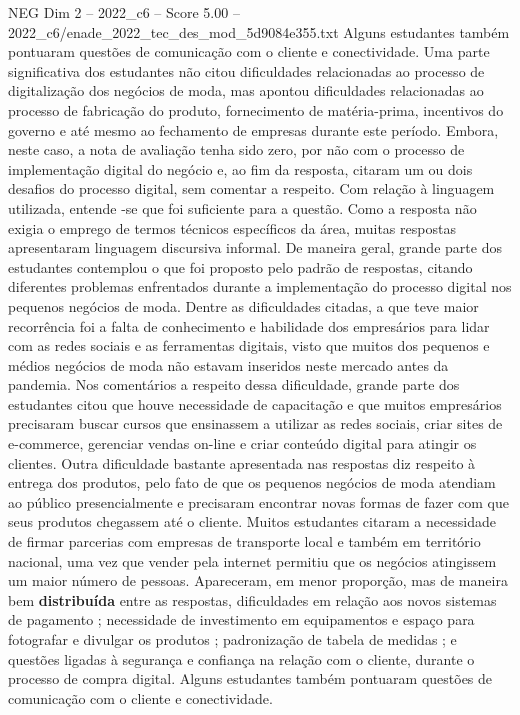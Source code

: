 \begin{textsample}{NEG Dim 2 – 2022\_c6 – Score 5.00 – 2022\_c6/enade\_2022\_tec\_des\_mod\_5d9084e355.txt}
Alguns estudantes também pontuaram questões de comunicação com o cliente e conectividade.
Uma parte significativa dos estudantes não citou dificuldades relacionadas ao processo de digitalização dos negócios de moda, mas apontou dificuldades relacionadas ao processo de fabricação do produto, fornecimento de matéria-prima, incentivos do governo e até mesmo ao fechamento de empresas durante este período.
Embora, neste caso, a nota de avaliação tenha sido zero, por não com o processo de implementação digital do negócio e, ao fim da resposta, citaram um ou dois desafios do processo digital, sem comentar a respeito.
Com relação à linguagem utilizada, entende -se que foi suficiente para a questão.
Como a resposta não exigia o emprego de termos técnicos específicos da área, muitas respostas apresentaram linguagem discursiva informal.
De maneira geral, grande parte dos estudantes contemplou o que foi proposto pelo padrão de respostas, citando diferentes problemas enfrentados durante a implementação do processo digital nos pequenos negócios de moda.
Dentre as dificuldades citadas, a que teve maior recorrência foi a falta de conhecimento e habilidade dos empresários para lidar com as redes sociais e as ferramentas digitais, visto que muitos dos pequenos e médios negócios de moda não estavam inseridos neste mercado antes da pandemia.
Nos comentários a respeito dessa dificuldade, grande parte dos estudantes citou que houve necessidade de capacitação e que muitos empresários precisaram buscar cursos que ensinassem a utilizar as redes sociais, criar sites de e-commerce, gerenciar vendas on-line e criar conteúdo digital para atingir os clientes.
Outra dificuldade bastante apresentada nas respostas diz respeito à entrega dos produtos, pelo fato de que os pequenos negócios de moda atendiam ao público presencialmente e precisaram encontrar novas formas de fazer com que seus produtos chegassem até o cliente.
Muitos estudantes citaram a necessidade de firmar parcerias com empresas de transporte local e também em território nacional, uma vez que vender pela internet permitiu que os negócios atingissem um maior número de pessoas.
Apareceram, em menor proporção, mas de maneira bem \textbf{distribuída} entre as respostas, dificuldades em relação aos novos sistemas de pagamento ; necessidade de investimento em equipamentos e espaço para fotografar e divulgar os produtos ; padronização de tabela de medidas ; e questões ligadas à segurança e confiança na relação com o cliente, durante o processo de compra digital.
Alguns estudantes também pontuaram questões de comunicação com o cliente e conectividade.

\end{textsample}

